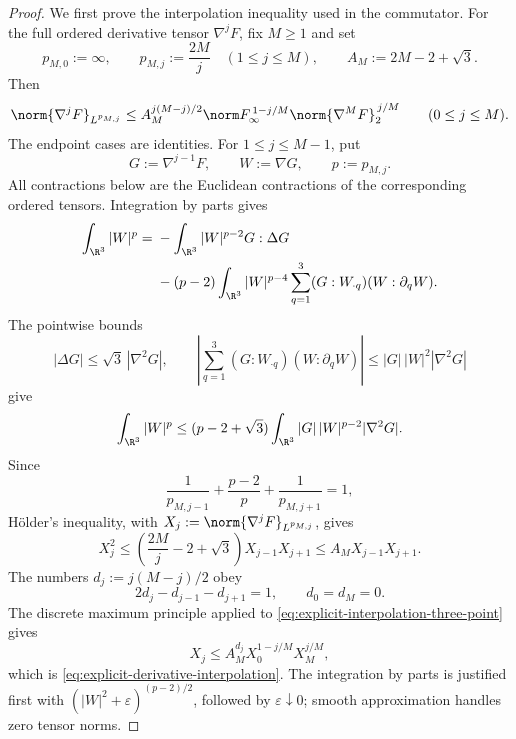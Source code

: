 \begin{proof}
We first prove the interpolation inequality used in the commutator.  For the
full ordered derivative tensor \(\nabla^jF\), fix \(M\ge1\) and set
\[
 p_{M,0}:=\infty,
 \qquad
 p_{M,j}:=\frac{2M}{j}\quad(1\le j\le M),
 \qquad
 A_M:=2M-2+\sqrt3.
\]
Then
\begin{equation}
 \norm{\nabla^jF}_{L^{p_{M,j}}}
 \le A_M^{j(M-j)/2}
 \norm F_\infty^{\,1-j/M}
 \norm{\nabla^MF}_2^{\,j/M}
 \qquad(0\le j\le M).
 \label{eq:explicit-derivative-interpolation}
\end{equation}
The endpoint cases are identities.  For \(1\le j\le M-1\), put
\[
 G:=\nabla^{j-1}F,
 \qquad W:=\nabla G,
 \qquad p:=p_{M,j}.
\]
All contractions below are the Euclidean contractions of the corresponding
ordered tensors.  Integration by parts gives
\begin{align*}
 \int_{\R^3}|W|^p
 ={}&-\int_{\R^3}|W|^{p-2}G:\Delta G\\
 &-(p-2)\int_{\R^3}|W|^{p-4}
   \sum_{q=1}^3(G:W_{\cdot q})(W:\partial_qW).
\end{align*}
The pointwise bounds
\[
 |\Delta G|\le\sqrt3\,|\nabla^2G|,
 \qquad
 \left|\sum_{q=1}^3(G:W_{\cdot q})(W:\partial_qW)\right|
 \le |G|\,|W|^2|\nabla^2G|
\]
give
\[
 \int_{\R^3}|W|^p
 \le(p-2+\sqrt3)
 \int_{\R^3}|G|\,|W|^{p-2}|\nabla^2G|.
\]
Since
\[
 \frac1{p_{M,j-1}}+\frac{p-2}{p}
 +\frac1{p_{M,j+1}}=1,
\]
H\"older's inequality, with
\(
 X_j:=\norm{\nabla^jF}_{L^{p_{M,j}}}
\), gives
\begin{equation}
 X_j^2
 \le\left(\frac{2M}{j}-2+\sqrt3\right)X_{j-1}X_{j+1}
 \le A_MX_{j-1}X_{j+1}.
 \label{eq:explicit-interpolation-three-point}
\end{equation}
The numbers \(d_j:=j(M-j)/2\) obey
\[
 2d_j-d_{j-1}-d_{j+1}=1,
 \qquad d_0=d_M=0.
\]
The discrete maximum principle applied to
\eqref{eq:explicit-interpolation-three-point} gives
\[
 X_j\le A_M^{d_j}X_0^{1-j/M}X_M^{j/M},
\]
which is \eqref{eq:explicit-derivative-interpolation}.  The integration by
parts is justified first with
\((|W|^2+\varepsilon)^{(p-2)/2}\), followed by
\(\varepsilon\downarrow0\); smooth approximation handles zero tensor norms.


\end{proof}
